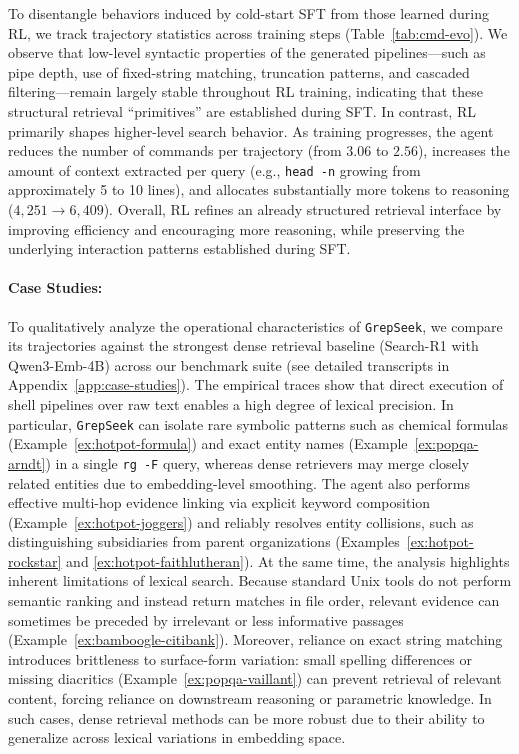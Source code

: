 \documentclass{llmxive}
\providecommand{\ourmethod}{\texttt{GrepSeek}\xspace}
\begin{document}
To disentangle behaviors induced by cold-start SFT from those learned during RL, we track trajectory statistics across training steps (Table~\ref{tab:cmd-evo}). We observe that low-level syntactic properties of the generated pipelines---such as pipe depth, use of fixed-string matching, truncation patterns, and cascaded filtering---remain largely stable throughout RL training, indicating that these structural retrieval ``primitives'' are established during SFT. In contrast, RL primarily shapes higher-level search behavior. As training progresses, the agent reduces the number of commands per trajectory (from $3.06$ to $2.56$), increases the amount of context extracted per query (e.g., \texttt{head -n} growing from approximately 5 to 10 lines), and allocates substantially more tokens to reasoning ($4{,}251 \rightarrow 6{,}409$). Overall, RL refines an already structured retrieval interface by improving efficiency and encouraging more reasoning, while preserving the underlying interaction patterns established during SFT.



\paragraph{Case Studies:}

To qualitatively analyze the operational characteristics of \ourmethod{}, we compare its trajectories against the strongest dense retrieval baseline (Search-R1 with Qwen3-Emb-4B) across our benchmark suite (see detailed transcripts in Appendix~\ref{app:case-studies}). The empirical traces show that direct execution of shell pipelines over raw text enables a high degree of lexical precision. In particular, \ourmethod{} can isolate rare symbolic patterns such as chemical formulas (Example~\ref{ex:hotpot-formula}) and exact entity names (Example~\ref{ex:popqa-arndt}) in a single \texttt{rg -F} query, whereas dense retrievers may merge closely related entities due to embedding-level smoothing. The agent also performs effective multi-hop evidence linking via explicit keyword composition (Example~\ref{ex:hotpot-joggers}) and reliably resolves entity collisions, such as distinguishing subsidiaries from parent organizations (Examples~\ref{ex:hotpot-rockstar} and \ref{ex:hotpot-faithlutheran}). At the same time, the analysis highlights inherent limitations of lexical search. Because standard Unix tools do not perform semantic ranking and instead return matches in file order, relevant evidence can sometimes be preceded by irrelevant or less informative passages (Example~\ref{ex:bamboogle-citibank}). Moreover, reliance on exact string matching introduces brittleness to surface-form variation: small spelling differences or missing diacritics (Example~\ref{ex:popqa-vaillant}) can prevent retrieval of relevant content, forcing reliance on downstream reasoning or parametric knowledge. In such cases, dense retrieval methods can be more robust due to their ability to generalize across lexical variations in embedding space.
\end{document}
